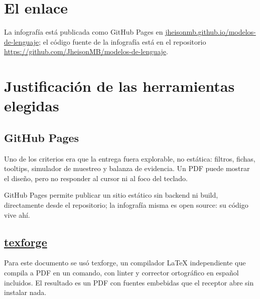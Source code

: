 \documentclass[a4paper,10pt]{article}
\begin{document}
\begin{center}
\setlength{\fboxsep}{14pt}
\end{center}

\vspace{1.5em}

\section*{El enlace}
La infografía está publicada como GitHub Pages en
\href{https://jheisonmb.github.io/modelos-de-lenguaje/}{jheisonmb.github.io/modelos-de-lenguaje};
el código fuente de la infografía está en el repositorio \url{https://github.com/JheisonMB/modelos-de-lenguaje}.

\section*{Justificación de las herramientas elegidas}

\subsection*{GitHub Pages}
Uno de los criterios era que la entrega fuera explorable, no estática: filtros,
fichas, tooltips, simulador de muestreo y balanza de evidencia. Un PDF puede
mostrar el diseño, pero no responder al cursor ni al foco del teclado.

\medskip

GitHub Pages permite publicar un sitio estático sin backend ni build, directamente
desde el repositorio; la infografía misma es open source: su código vive ahí.

\subsection*{\href{https://univerlab.org/texforge}{texforge}}
Para este documento se usó texforge, un compilador LaTeX independiente que compila
a PDF en un comando, con linter y corrector ortográfico en español incluidos. El resultado es un PDF con fuentes embebidas
que el receptor abre sin instalar nada.
\end{document}
